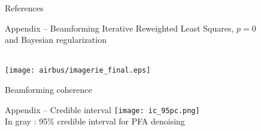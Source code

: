 \documentclass[10pt,xcolor=x11names,compress, show notes]{beamer}%
\begin{document}
\appendix
\setcounter{finalframe}{\value{framenumber}}
\begin{frame}{References}
		\setlength{\bibsep}{2em}
		
		
\end{frame}


\begin{frame}{Appendix -- Beamforming}
	\centering
	\footnotesize Iterative Reweighted Least Squares, $p=0$ \\ and Bayesian regularization\\~\\
	\begin{minipage}{1.1\textwidth}
			\hspace{-0.65cm}\texttt{[image: airbus/imagerie\_final.eps]}\\
\end{minipage}

	Beamforming coherence

\end{frame}

\begin{frame}{Appendix -- Credible interval}
\centering
\texttt{[image: ic\_95pc.png]}\\
In gray : 95\% credible interval for PFA denoising
\end{frame}
\setcounter{framenumber}{\value{finalframe}}
\end{document}
